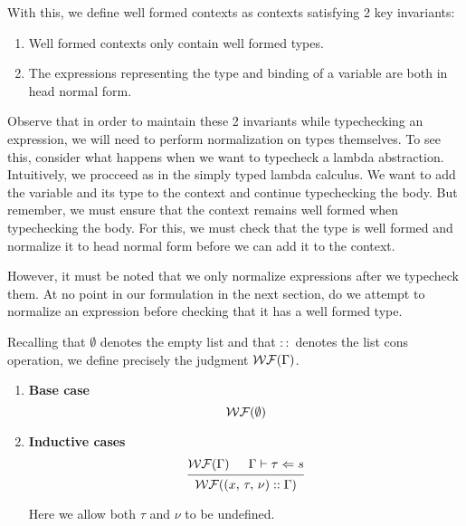 \documentclass{article}
\begin{document}
With this, we define well formed contexts as contexts satisfying 2 key invariants:
\begin{enumerate}
  \item Well formed contexts only contain well formed types.
  \item The expressions representing the type and binding of a variable are both
  in head normal form.
\end{enumerate}

Observe that in order to maintain these 2 invariants while typechecking
an expression,  we will need to perform normalization on types themselves.
To see this, consider what happens when we want to typecheck a lambda abstraction.
Intuitively, we procceed as in the simply typed lambda calculus. We want to add
the variable and its type to the context and continue typechecking the body.
But remember, we must ensure that the context remains well formed when
typechecking the body. For this, we must check that the type is well formed and
normalize it to head normal form before we can add it to the context.

However, it must be noted that we only normalize expressions after we typecheck
them. At no point in our formulation in the next section, do we attempt to
normalize an expression before checking that it has a well formed type.

\begin{definition} 
  Recalling that $\emptyset$ denotes the empty list and that $::$ denotes the list
  cons operation, we define precisely the judgment $\operatorname{\mathcal{WF}}(\Gamma)$.

  \begin{enumerate}
  \item \textbf{Base case} \\
    \[
      \begin{prooftree}
        \hypo{\wf(\emptyset)}
      \end{prooftree}
    \]

  \item \textbf{Inductive cases} \\
    \[
      \begin{prooftree}
        \hypo{\wf(\Gamma)}
        \hypo{\Gamma \vdash \tau \Leftarrow s}
        \infer2{\wf ((x, \, \tau, \, \nu) :: \Gamma)}
      \end{prooftree}
    \]

    Here we allow both $\tau$ and $\nu$ to be undefined.

  \end{enumerate}
\end{definition}
\end{document}
